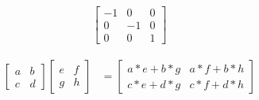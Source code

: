 \begin{align*}
  \left[\begin{array}{ccc}
    -1 & 0 & 0 \\
    0 & -1 & 0 \\
    0 & 0 & 1
  \end{array}\right]
\end{align*}

\begin{align*}
  \left[\begin{array}{rr}
    a & b \\
    c & d
  \end{array} \right]
  \left[\begin{array}{rr}
    e & f \\
    g & h
  \end{array} \right]
  & = 
  \left[\begin{array}{rr}
    a*e + b*g & a*f + b*h \\
    c*e + d*g & c*f + d*h
  \end{array} \right]
\end{align*}
